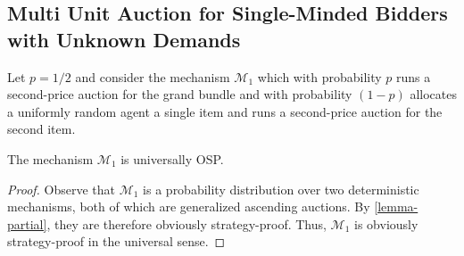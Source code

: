 \subsection{Multi Unit Auction for Single-Minded Bidders with Unknown Demands} \label{subsec:22-mua-sm}
Let $p = 1/2$ and consider the mechanism $\mathcal{M}_1$ which with probability $p$ runs a second-price auction for the grand bundle and with probability $(1-p)$ allocates a uniformly random agent a single item and runs a second-price auction for the second item.  
\begin{claim}\label{claim-mec-sm-mua-osp}
   The mechanism $\mathcal{M}_1$ is universally OSP.  
\end{claim}
\begin{proof}
Observe that $\mathcal{M}_1$ is a probability distribution over two deterministic mechanisms, both of which are generalized ascending auctions. By \cref{lemma-partial}, they are therefore obviously strategy-proof. Thus, $\mathcal M_1$ is obviously strategy-proof in the universal sense.
\end{proof}

